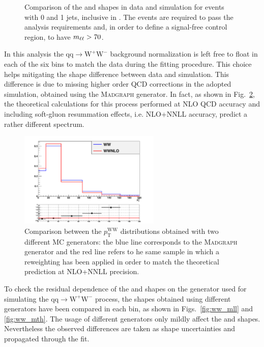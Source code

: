 \begin{figure}[!htb]
\caption{Comparison of the \mll and \mt shapes in data and simulation for events with 0 and 1 jets, inclusive in \pth. The events are required to pass the analysis requirements and, in order to define a signal-free control region, to have $m_{\ell\ell} > 70$\GeV.\label{fig:WW}}
\end{figure}

In this analysis the $\mathrm{qq\to W^{+}W^{-}}$ background normalization is left free to float in each of the six \pth bins to match the data during the fitting procedure. This choice helps mitigating the \pth shape difference between data and simulation. This difference is due to missing higher order QCD corrections in the adopted simulation, obtained using the \textsc{Madgraph} generator. In fact, as shown in Fig.~\ref{fig:ww_wwnlo}, the theoretical calculations for this process performed at NLO QCD accuracy and including soft-gluon resummation effects, i.e. NLO+NNLL accuracy, predict a rather different \pth spectrum.

\begin{figure}[htb]
\centering
\includegraphics[width=0.6\textwidth]{images/WWnlo/WW_WWnlo.pdf}
\caption{Comparison between the $p_\mathrm{T}^\mathrm{WW}$ distributions obtained with two different MC generators: the blue line corresponds to the \textsc{Madgraph} generator and the red line refers to he same sample in which a reweighting has been applied in order to match the theoretical prediction at NLO+NNLL precision. }\label{fig:ww_wwnlo}
\end{figure}

To check the residual dependence of the \mll and \mt shapes on the generator used for simulating the $\mathrm{qq\to W^{+}W^{-}}$ process, the shapes obtained using different generators have been compared in each \pth bin, as shown in Figs.~\ref{fig:ww_mll} and \ref{fig:ww_mth}. The usage of different generators only mildly affect the \mll and \mt shapes. Nevertheless the observed differences are taken as shape uncertainties and propagated through the fit.

